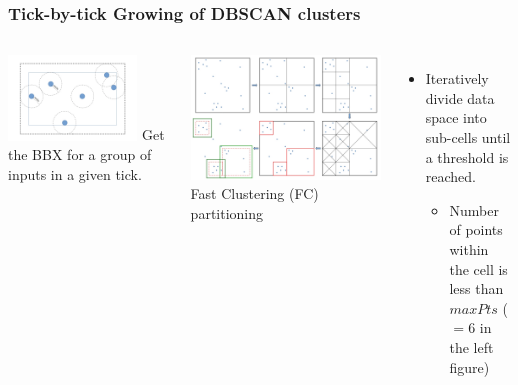 \begin{frame}
    \frametitle{Tick-by-tick Growing of DBSCAN clusters}
    \begin{columns}
                \begin{columns}
                        \centering             \includegraphics[width=0.8\textwidth]{resource/figures/boundingbox.png}
                        \tiny Get the BBX for a group of inputs in a given tick.
                \end{columns}
            \centering
            \includegraphics[width=\textwidth]{resource/figures/rt-dbscan.png}
        \small Fast Clustering (FC) partitioning
        \begin{itemize}
            \item \tiny Iteratively divide data space into sub-cells until a threshold is reached.
            \begin{itemize}
                \item \tiny Number of points within the cell is less than $maxPts$ ($=6$ in the left figure)

\end{itemize}
\end{itemize}
\end{columns}
\end{frame}
